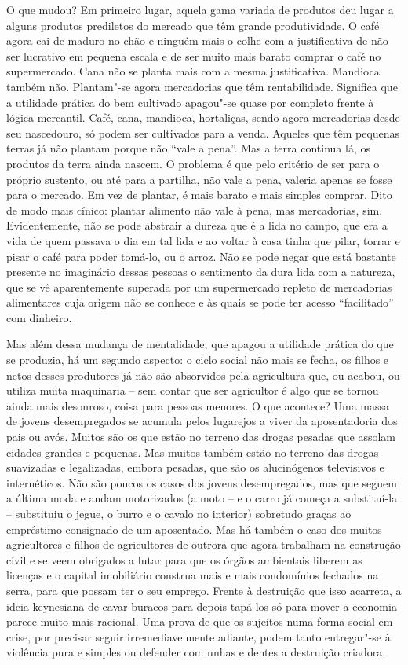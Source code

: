 O que mudou? Em primeiro lugar, aquela gama variada de produtos deu
lugar a alguns produtos prediletos do mercado que têm grande
produtividade. O café agora cai de maduro no chão e ninguém mais o colhe
com a justificativa de não ser lucrativo em pequena escala e de ser
muito mais barato comprar o café no supermercado. Cana não se planta
mais com a mesma justificativa. Mandioca também não. Plantam"-se agora
mercadorias que têm rentabilidade. Significa que a utilidade prática do
bem cultivado apagou"-se quase por completo frente à lógica mercantil.
Café, cana, mandioca, hortaliças, sendo agora mercadorias desde seu
nascedouro, só podem ser cultivados para a venda. Aqueles que têm
pequenas terras já não plantam porque não ``vale a pena''. Mas a terra
continua lá, os produtos da terra ainda nascem. O problema é que pelo
critério de ser para o próprio sustento, ou até para a partilha, não
vale a pena, valeria apenas se fosse para o mercado. Em vez de plantar,
é mais barato e mais simples comprar. Dito de modo mais cínico: plantar
alimento não vale à pena, mas mercadorias, sim. Evidentemente, não se
pode abstrair a dureza que é a lida no campo, que era a vida de quem
passava o dia em tal lida e ao voltar à casa tinha que pilar, torrar e
pisar o café para poder tomá-lo, ou o arroz. Não se pode negar que está
bastante presente no imaginário dessas pessoas o sentimento da dura lida
com a natureza, que se vê aparentemente superada por um supermercado
repleto de mercadorias alimentares cuja origem não se conhece e às quais
se pode ter acesso ``facilitado'' com dinheiro.

Mas além dessa mudança de mentalidade, que apagou a utilidade prática do
que se produzia, há um segundo aspecto: o ciclo social não mais se
fecha, os filhos e netos desses produtores já não são absorvidos pela
agricultura que, ou acabou, ou utiliza muita maquinaria -- sem contar
que ser agricultor é algo que se tornou ainda mais desonroso, coisa para
pessoas menores. O que acontece? Uma massa de jovens desempregados se
acumula pelos lugarejos a viver da aposentadoria dos pais ou avós.
Muitos são os que estão no terreno das drogas pesadas que assolam
cidades grandes e pequenas. Mas muitos também estão no terreno das
drogas suavizadas e legalizadas, embora pesadas, que são os alucinógenos
televisivos e internéticos. Não são poucos os casos dos jovens
desempregados, mas que seguem a última moda e andam motorizados (a moto
-- e o carro já começa a substituí-la -- substituiu o jegue, o burro e o
cavalo no interior) sobretudo graças ao empréstimo consignado de um
aposentado. Mas há também o caso dos muitos agricultores e filhos de
agricultores de outrora que agora trabalham na construção civil e se
veem obrigados a lutar para que os órgãos ambientais liberem as licenças
e o capital imobiliário construa mais e mais condomínios fechados na
serra, para que possam ter o seu emprego. Frente à destruição que isso
acarreta, a ideia keynesiana de cavar buracos para depois tapá-los só
para mover a economia parece muito mais racional. Uma prova de que os
sujeitos numa forma social em crise, por precisar seguir
irremediavelmente adiante, podem tanto entregar"-se à violência pura e
simples ou defender com unhas e dentes a destruição criadora.


